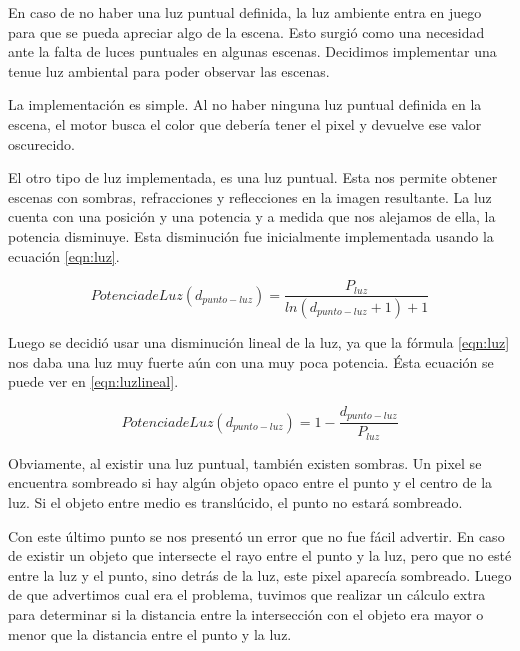 \documentclass[a4paper,10pt]{article}
\begin{document}
En caso de no haber una luz puntual definida, la luz ambiente entra en juego
para que se pueda apreciar algo de la escena.  Esto surgi\'o como una necesidad
ante la falta de luces puntuales en algunas escenas.  Decidimos implementar una
tenue luz ambiental para poder observar las escenas.

La implementaci\'on es simple.  Al no haber ninguna luz puntual definida en la
escena, el motor busca el color que deber\'ia tener el pixel y devuelve ese
valor oscurecido.

El otro tipo de luz implementada, es una luz puntual.  Esta nos permite obtener
escenas con sombras, refracciones y reflecciones en la imagen resultante.  La
luz cuenta con una posici\'on y una potencia y a medida que nos alejamos de
ella, la potencia disminuye.  Esta disminuci\'on fue inicialmente implementada
usando la ecuaci\'on \ref{eqn:luz}.

\begin{equation}
\label{eqn:luz}
Potencia de Luz (d_{punto-luz}) = \frac{P_{luz}}{ln( d_{punto-luz} + 1 ) + 1}
\end{equation}

Luego se decidi\'o usar una disminuci\'on lineal de la luz, ya que la f\'ormula
\ref{eqn:luz} nos daba una luz muy fuerte a\'un con una muy poca potencia. \'Esta ecuaci\'on
se puede ver en \ref{eqn:luzlineal}.

\begin{equation}
\label{eqn:luzlineal}
Potencia de Luz (d_{punto-luz}) = 1 - \frac{d_{punto-luz}}{P_{luz}}
\end{equation}


Obviamente, al existir una luz puntual, tambi\'en existen sombras.  Un pixel se
encuentra sombreado si hay alg\'un objeto opaco entre el punto y el centro de
la luz.  Si el objeto entre medio es transl\'ucido, el punto no estar\'a
sombreado.

Con este \'ultimo punto se nos present\'o un error que no fue f\'acil advertir.
 En caso de existir un objeto que intersecte el rayo entre el punto y la luz,
pero que no est\'e entre la luz y el punto, sino detr\'as de la luz, este pixel
aparec\'ia sombreado.  Luego de que advertimos cual era el problema, tuvimos
que realizar un c\'alculo extra para determinar si la distancia entre la
intersecci\'on con el objeto era mayor o menor que la distancia entre el punto
y la luz.
\end{document}

